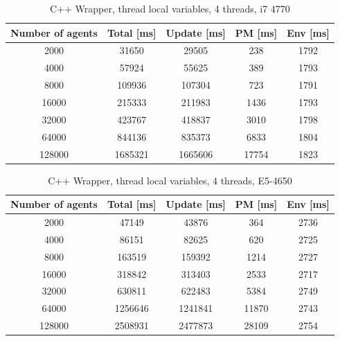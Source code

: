 \documentclass[12pt, a4paper]{report}
\begin{document}
\begin{appendices}
\begin{table}[H]
  \begin{center}
    \begin{tabular}{|c||c||c|c|c|}
    \hline
    Number of agents & Total [ms] & Update [ms] & PM [ms] & Env [ms] \\ \hline
    2000             & 31650      & 29505       & 238     & 1792     \\
    4000             & 57924      & 55625       & 389     & 1793     \\
    8000             & 109936     & 107304      & 723     & 1791     \\
    16000            & 215333     & 211983      & 1436    & 1793     \\
    32000            & 423767     & 418837      & 3010    & 1798     \\
    64000            & 844136     & 835373      & 6833    & 1804     \\
    128000           & 1685321    & 1665606     & 17754   & 1823     \\ \hline
    \end{tabular}
    \caption {C++ Wrapper, thread local variables, 4 threads, i7 4770}
    \label{table:append-c++-wrap-4-thread-line}
  \end{center}
\end{table}

\begin{table}[H]
  \begin{center}
    \begin{tabular}{|c||c||c|c|c|}
    \hline
     Number of agents & Total [ms] & Update [ms] & PM [ms] & Env [ms] \\ \hline
     2000             & 47149      & 43876       & 364     & 2736     \\
     4000             & 86151      & 82625       & 620     & 2725     \\
     8000             & 163519     & 159392      & 1214    & 2727     \\
     16000            & 318842     & 313403      & 2533    & 2717     \\
     32000            & 630811     & 622483      & 5384    & 2749     \\
     64000            & 1256646    & 1241841     & 11870   & 2743     \\
     128000           & 2508931    & 2477873     & 28109   & 2754     \\ \hline
    \end{tabular}
    \caption {C++ Wrapper, thread local variables, 4 threads, E5-4650}
    \label{table:append-c++-wrap-4-thread-potoo}
  \end{center}
\end{table}



\end{appendices}
\end{document}

